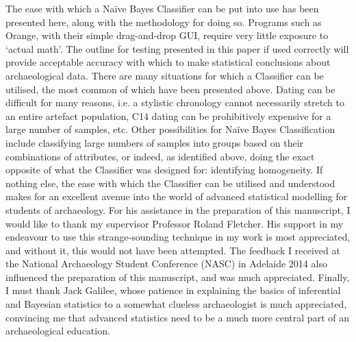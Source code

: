 The ease with which a Naïve Bayes Classifier can be put into use has been presented here, along with the methodology for doing so. Programs such as Orange, with their simple drag-and-drop GUI, require very little exposure to ‘actual math’. The outline for testing presented in this paper if used correctly will provide acceptable accuracy with which to make statistical conclusions about archaeological data. There are many situations for which a Classifier can be utilised, the most common of which have been presented above. Dating can be difficult for many reasons, i.e. a stylistic chronology cannot necessarily stretch to an entire artefact population, C14 dating can be prohibitively expensive for a large number of samples, etc. Other possibilities for Naïve Bayes Classification include classifying large numbers of samples into groups based on their combinations of attributes, or indeed, as identified above, doing the exact opposite of what the Classifier was designed for: identifying homogeneity. If nothing else, the ease with which the Classifier can be utilised and understood makes for an excellent avenue into the world of advanced statistical modelling for students of archaeology.
\myseparator
For his assistance in the preparation of this manuscript, I would like to thank my supervisor Professor Roland Fletcher. His support in my endeavour to use this strange-sounding technique in my work is most appreciated, and without it, this would not have been attempted. The feedback I received at the National Archaeology Student Conference (NASC) in Adelaide 2014 also influenced the preparation of this manuscript, and was much appreciated. Finally, I must thank Jack Galilee, whose patience in explaining the basics of inferential and Bayesian statistics to a somewhat clueless archaeologist is much appreciated, convincing me that advanced statistics need to be a much more central part of an archaeological education. 


